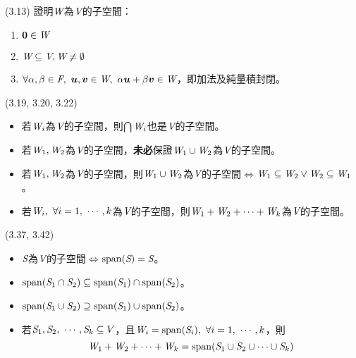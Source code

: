 \item \begin{theorem}{(3.13)} 
	證明$\textit{W}$為$\textit{V}$的子空間：\begin{enumerate}
		\item $\boldsymbol{0} \in \textit{W}$
		\item $\textit{W} \subseteq \textit{V}, \textit{W} \neq \emptyset$
		\item $\forall \alpha, \beta \in \F, \ \vec{u}, \vec{v} \in \spc{W}, \ \alpha\vec{u} + \beta\vec{v} \in \spc{W}$，即加法及純量積封閉。
	\end{enumerate}
\end{theorem}

\item \begin{theorem}{(3.19, 3.20, 3.22)} \quad\quad
	\begin{itemize}
		\item 若$\textit{W}_i$為$\textit{V}$的子空間，則$\bigcap\textit{W}_i$也是$\textit{V}$的子空間。
		\item 若$\textit{W}_1, \textit{W}_2$為$\textit{V}$的子空間，\textbf{未必}保證$\textit{W}_1 \cup \textit{W}_2$為$\textit{V}$的子空間。
		\item 若$\textit{W}_1, \textit{W}_2$為$\textit{V}$的子空間，則$\textit{W}_1 \cup \textit{W}_2$為$\textit{V}$的子空間$\iff$$\textit{W}_1 \subseteq \textit{W}_2 \lor \textit{W}_2 \subseteq \textit{W}_1$。
		\item 若$\spc{W}_i, \ \forall i = 1, \ \cdots, k$為$\textit{V}$的子空間，則$\textit{W}_1 + \textit{W}_2 + \cdots + \textit{W}_k$為$\textit{V}$的子空間。
	\end{itemize}
\end{theorem}

\item \begin{theorem}{(3.37, 3.42)} \quad\quad
	\begin{itemize}
		\item $\textit{S}$為$\textit{V}$的子空間$\iff$$\operatorname{span}(\textit{S}) = \textit{S}$。
		\item $\operatorname{span}(\textit{S}_1 \cap \textit{S}_2) \subseteq \operatorname{span}(\textit{S}_1) \cap \operatorname{span}(\textit{S}_2)$。
		\item $\operatorname{span}(\textit{S}_1 \cup \textit{S}_2) \supseteq \operatorname{span}(\textit{S}_1) \cup \operatorname{span}(\textit{S}_2)$。
		\item 若$\textit{S}_1, \textit{S}_2, \ \cdots, \textit{S}_k \subseteq V$，且$\textit{W}_i = \operatorname{span}(\textit{S}_i), \ \forall i = 1,\ \cdots, k$，則
		\begin{equation}
			\textit{W}_1 + \textit{W}_2 + \cdots + \textit{W}_k = \operatorname{span}(\textit{S}_1 \cup \textit{S}_2 \cup \cdots \cup \textit{S}_k)
		\end{equation}
	\end{itemize}
\end{theorem}

